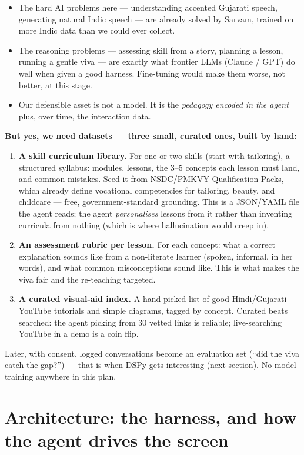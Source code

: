 \documentclass[11pt]{article}
\begin{document}
\begin{itemize}
  \item The hard AI problems here --- understanding accented Gujarati speech, generating natural Indic speech --- are already solved by Sarvam, trained on more Indic data than we could ever collect.
  \item The reasoning problems --- assessing skill from a story, planning a lesson, running a gentle viva --- are exactly what frontier LLMs (Claude / GPT) do well when given a good harness. Fine-tuning would make them worse, not better, at this stage.
  \item Our defensible asset is not a model. It is the \emph{pedagogy encoded in the agent} plus, over time, the interaction data.
\end{itemize}

\textbf{But yes, we need datasets --- three small, curated ones, built by hand:}

\begin{enumerate}
  \item \textbf{A skill curriculum library.} For one or two skills (start with tailoring), a structured syllabus: modules, lessons, the 3--5 concepts each lesson must land, and common mistakes. Seed it from NSDC/PMKVY Qualification Packs, which already define vocational competencies for tailoring, beauty, and childcare --- free, government-standard grounding. This is a JSON/YAML file the agent reads; the agent \emph{personalises} lessons from it rather than inventing curricula from nothing (which is where hallucination would creep in).
  \item \textbf{An assessment rubric per lesson.} For each concept: what a correct explanation sounds like from a non-literate learner (spoken, informal, in her words), and what common misconceptions sound like. This is what makes the viva fair and the re-teaching targeted.
  \item \textbf{A curated visual-aid index.} A hand-picked list of good Hindi/Gujarati YouTube tutorials and simple diagrams, tagged by concept. Curated beats searched: the agent picking from 30 vetted links is reliable; live-searching YouTube in a demo is a coin flip.
\end{enumerate}

Later, with consent, logged conversations become an evaluation set (``did the viva catch the gap?'') --- that is when DSPy gets interesting (next section). No model training anywhere in this plan.

\section{Architecture: the harness, and how the agent drives the screen}
\end{document}

